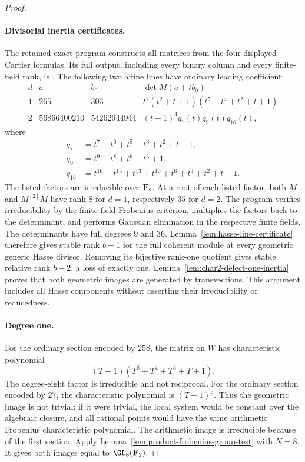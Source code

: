 \begin{proof}
\paragraph{Divisorial inertia certificates.}
The retained exact program
constructs all matrices from the four displayed Cartier formulas.
Its full output, including every binary column and every finite-field
rank, is
.
The following two affine lines have ordinary leading coefficient:
\[
 \begin{array}{c|r|r|l}
 d&a&b_0&\det M(a+t b_0)\\ \hline
 1&265&303&t^2(t^2+t+1)(t^5+t^4+t^2+t+1)\\
 2&56866400210&54262944944&(t+1)^4q_7(t)q_9(t)q_{16}(t),
 \end{array}
\]
where
\[
\begin{split}
 q_7&=t^7+t^6+t^5+t^3+t^2+t+1,\\
 q_9&=t^9+t^8+t^6+t^3+1,\\
 q_{16}&=t^{16}+t^{15}+t^{13}+t^{10}+t^6+t^3+t^2+t+1.
\end{split}
\]
The listed factors are irreducible over $\mathbf F_2$.
At a root of each listed factor, both $M$ and $M^{[2]}M$
have rank $8$ for $d=1$, respectively $35$ for $d=2$.
The program verifies irreducibility by the finite-field Frobenius
criterion, multiplies the factors back to the determinant, and
performs Gaussian elimination in the respective finite fields.
The determinants have full degrees $9$ and $36$.
Lemma~\ref{lem:hasse-line-certificate} therefore gives stable rank
$b-1$ for the full coherent module at every geometric generic
Hasse divisor.  Removing its bijective rank-one quotient gives
stable relative rank $b-2$, a loss of exactly one.
Lemma~\ref{lem:char2-defect-one-inertia} proves that both geometric
images are generated by transvections.  This argument includes
all Hasse components without asserting their irreducibility or
reducedness.

\paragraph{Degree one.}
For the ordinary section encoded by $258$, the matrix on $W$
has characteristic polynomial
\[
 (T+1)(T^8+T^4+T^3+T+1).
\]
The degree-eight factor is irreducible and not reciprocal.
For the ordinary section encoded by $27$, the characteristic
polynomial is $(T+1)^9$.
Thus the geometric image is not trivial: if it were trivial,
the local system would be constant over the algebraic closure,
and all rational points would have the same arithmetic Frobenius
characteristic polynomial.  The arithmetic image is irreducible
because of the first section.  Apply
Lemma~\ref{lem:product-frobenius-group-test} with $N=8$.
It gives both images equal to $\GL_8(\mathbf F_2)$.


\end{proof}
